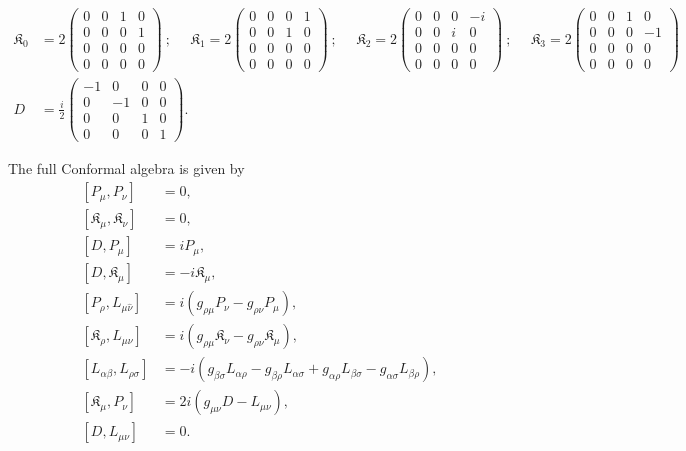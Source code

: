 \documentclass[]{article}
\numberwithin{equation}{section}
\begin{document}
{{\begin{align*}
    \mathfrak{K}_0&={2}\begin{pmatrix}
    0&0&1&0\\
    0&0&0&1\\
    0&0&0&0\\
    0&0&0&0
    \end{pmatrix}~;~~~~~~\mathfrak{K}_1={2}\begin{pmatrix}
    0&0&0&1\\
    0&0&1&0\\
    0&0&0&0\\
    0&0&0&0
    \end{pmatrix}~;~~~~~~\mathfrak{K}_2={2}\begin{pmatrix}
    0&0&0&-i\\
    0&0&i&0\\
    0&0&0&0\\
    0&0&0&0
    \end{pmatrix}~;~~~~~~\mathfrak{K}_3={2}\begin{pmatrix}
    0&0&1&0\\
    0&0&0&-1\\
    0&0&0&0\\
    0&0&0&0
    \end{pmatrix}\\
    D&=\frac{i}{2}\begin{pmatrix}
    -1&0&0&0\\
    0&-1&0&0\\
    0&0&1&0\\
    0&0&0&1
    \end{pmatrix}.
\end{align*}


The full Conformal algebra is given by
\begin{align}
    \left[P_{{\mu}},P_{{\nu}}\right]&=0,\\
    \left[\mathfrak{K}_{{\mu}},\mathfrak{K}_{{\nu}}\right]&=0,\\
 \left[D, P_{{\mu}}\right]&=iP_{{\mu}},\\
 \left[D, \mathfrak{K}_{{\mu}}\right]&=-i\mathfrak{K}_{{\mu}},\\
 \left[P_{{\rho}},L_{{\mu}\hat{\nu}}\right]&=i\left(g_{{\rho}{\mu}}P_{{\nu}}-g_{{\rho}{\nu}}P_{{\mu}}\right),\\
 \left[\mathfrak{K}_{{\rho}},L_{{\mu}{\nu}}\right]&=i\left(g_{{\rho}{\mu}}\mathfrak{K}_{{\nu}}-g_{{\rho}{\nu}}\mathfrak{K}_{{\mu}}\right),\\
 \left[L_{{\alpha}{\beta}},L_{{\rho}{\sigma}}\right]&=-i\left(g_{{\beta}{\sigma}}L_{{\alpha}{\rho}}-g_{{\beta}{\rho}}L_{{\alpha}{\sigma}}+g_{{\alpha}{\rho}}L_{{\beta}{\sigma}}-g_{{\alpha}{\sigma}}L_{{\beta}{\rho}}\right),\\
 \left[\mathfrak{K}_{{\mu}},P_{{\nu}}\right]&=2i\left(g_{{\mu}{\nu}}D-L_{{\mu}{\nu}}\right),\\
 \left[D, L_{{\mu}{\nu}}\right]&=0.
\end{align} 

}}
\end{document}
